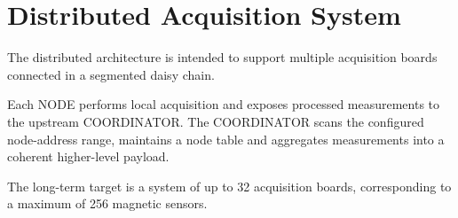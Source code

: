 \chapter{Distributed Acquisition System}

The distributed architecture is intended to support multiple acquisition boards connected in a segmented daisy chain.

Each NODE performs local acquisition and exposes processed measurements to the upstream COORDINATOR. The COORDINATOR scans the configured node-address range, maintains a node table and aggregates measurements into a coherent higher-level payload.

The long-term target is a system of up to 32 acquisition boards, corresponding to a maximum of 256 magnetic sensors.

